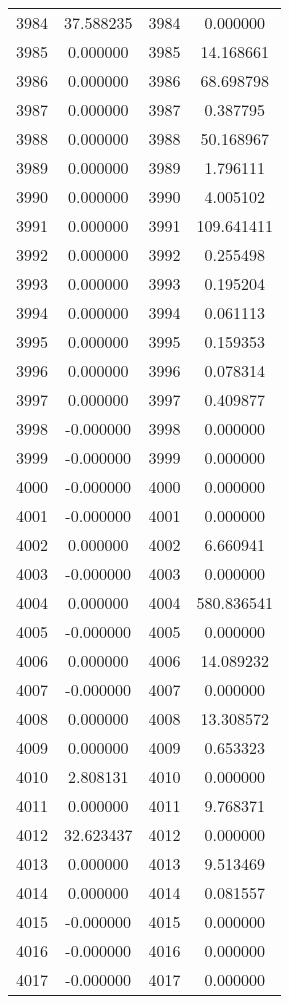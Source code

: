 \documentclass[12pt]{article}
\begin{document}
\begin{longtable}{@{}cccc@{}}
3984 & 37.588235 & 3984 & 0.000000 \\
3985 & 0.000000 & 3985 & 14.168661 \\
3986 & 0.000000 & 3986 & 68.698798 \\
3987 & 0.000000 & 3987 & 0.387795 \\
3988 & 0.000000 & 3988 & 50.168967 \\
3989 & 0.000000 & 3989 & 1.796111 \\
3990 & 0.000000 & 3990 & 4.005102 \\
3991 & 0.000000 & 3991 & 109.641411 \\
3992 & 0.000000 & 3992 & 0.255498 \\
3993 & 0.000000 & 3993 & 0.195204 \\
3994 & 0.000000 & 3994 & 0.061113 \\
3995 & 0.000000 & 3995 & 0.159353 \\
3996 & 0.000000 & 3996 & 0.078314 \\
3997 & 0.000000 & 3997 & 0.409877 \\
3998 & -0.000000 & 3998 & 0.000000 \\
3999 & -0.000000 & 3999 & 0.000000 \\
4000 & -0.000000 & 4000 & 0.000000 \\
4001 & -0.000000 & 4001 & 0.000000 \\
4002 & 0.000000 & 4002 & 6.660941 \\
4003 & -0.000000 & 4003 & 0.000000 \\
4004 & 0.000000 & 4004 & 580.836541 \\
4005 & -0.000000 & 4005 & 0.000000 \\
4006 & 0.000000 & 4006 & 14.089232 \\
4007 & -0.000000 & 4007 & 0.000000 \\
4008 & 0.000000 & 4008 & 13.308572 \\
4009 & 0.000000 & 4009 & 0.653323 \\
4010 & 2.808131 & 4010 & 0.000000 \\
4011 & 0.000000 & 4011 & 9.768371 \\
4012 & 32.623437 & 4012 & 0.000000 \\
4013 & 0.000000 & 4013 & 9.513469 \\
4014 & 0.000000 & 4014 & 0.081557 \\
4015 & -0.000000 & 4015 & 0.000000 \\
4016 & -0.000000 & 4016 & 0.000000 \\
4017 & -0.000000 & 4017 & 0.000000 \\

\end{longtable}
\end{document}
